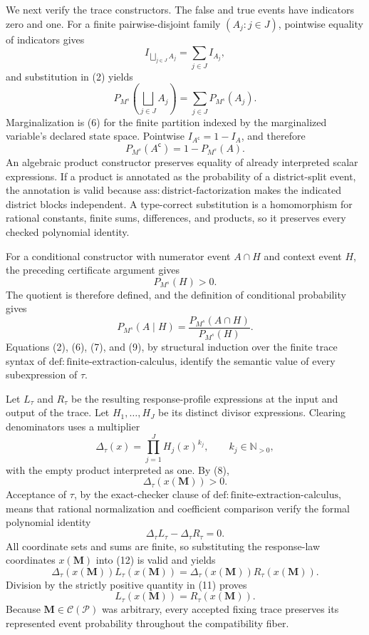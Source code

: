 We next verify the trace constructors.  The false and true events have indicators zero and one.  For a finite pairwise-disjoint family \((A_j:j\in J)\), pointwise equality of indicators gives
\[
 I_{\bigsqcup_{j\in J}A_j}=\sum_{j\in J}I_{A_j},
\]
and substitution in (2) yields
\[
 P_{M^s}\!\left(\bigsqcup_{j\in J}A_j\right)
 =\sum_{j\in J}P_{M^s}(A_j).
\tag{6}
\]
Marginalization is (6) for the finite partition indexed by the marginalized variable's declared state space.  Pointwise \(I_{A^{\mathsf c}}=1-I_A\), and therefore
\[
 P_{M^s}(A^{\mathsf c})=1-P_{M^s}(A).
\tag{7}
\]
An algebraic product constructor preserves equality of already interpreted scalar expressions.  If a product is annotated as the probability of a district-split event, the annotation is valid because \(\mathrm{ass:district\text{-}factorization}\) makes the indicated district blocks independent.  A type-correct substitution is a homomorphism for rational constants, finite sums, differences, and products, so it preserves every checked polynomial identity.

For a conditional constructor with numerator event \(A\cap H\) and context event \(H\), the preceding certificate argument gives
\[
 P_{M^s}(H)>0.
\tag{8}
\]
The quotient is therefore defined, and the definition of conditional probability gives
\[
 P_{M^s}(A\mid H)
 =\frac{P_{M^s}(A\cap H)}{P_{M^s}(H)}.
\tag{9}
\]
Equations (2), (6), (7), and (9), by structural induction over the finite trace syntax of \(\mathrm{def:finite\text{-}extraction\text{-}calculus}\), identify the semantic value of every subexpression of \(\tau\).

Let \(L_\tau\) and \(R_\tau\) be the resulting response-profile expressions at the input and output of the trace.  Let \(H_1,\ldots,H_J\) be its distinct divisor expressions.  Clearing denominators uses a multiplier
\[
 \Delta_\tau(x)=\prod_{j=1}^{J}H_j(x)^{k_j},
 \qquad k_j\in\mathbb N_{>0},
\tag{10}
\]
with the empty product interpreted as one.  By (8),
\[
 \Delta_\tau(x(\mathbf M))>0.
\tag{11}
\]
Acceptance of \(\tau\), by the exact-checker clause of \(\mathrm{def:finite\text{-}extraction\text{-}calculus}\), means that rational normalization and coefficient comparison verify the formal polynomial identity
\[
 \Delta_\tau L_\tau-\Delta_\tau R_\tau=0.
\tag{12}
\]
All coordinate sets and sums are finite, so substituting the response-law coordinates \(x(\mathbf M)\) into (12) is valid and yields
\[
 \Delta_\tau(x(\mathbf M))L_\tau(x(\mathbf M))
 =\Delta_\tau(x(\mathbf M))R_\tau(x(\mathbf M)).
\]
Division by the strictly positive quantity in (11) proves
\[
 L_\tau(x(\mathbf M))=R_\tau(x(\mathbf M)).
\]
Because \(\mathbf M\in\mathcal C(\mathcal P)\) was arbitrary, every accepted fixing trace preserves its represented event probability throughout the compatibility fiber.